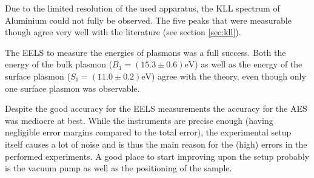 \documentclass[a4paper]{scrartcl}
\numberwithin{equation}{section}
\numberwithin{figure}{section}
\numberwithin{table}{section}
\begin{document}
Due to the limited resolution of the used apparatus, the KLL spectrum of Aluminium could not fully be observed. The five peaks that were measurable though agree very well with the literature (see section \ref{sec:kll}).

The EELS to measure the energies of plasmons was a full success. Both the energy of the bulk plasmon ($B_1 = (15.3\pm 0.6)\text{eV}$) as well as the energy of the surface plasmon ($S_1 = (11.0\pm 0.2)\text{eV}$) agree with the theory, even though only one surface plasmon was observable.

Despite the good accuracy for the EELS measurements the accuracy for the AES was mediocre at best. While the instruments are precise enough (having negligible error margins compared to the total error), the experimental setup itself causes a lot of noise and is thus the main reason for the (high) errors in the performed experiments. A good place to start improving upon the setup probably is the vacuum pump as well as the positioning of the sample.



\end{document}
